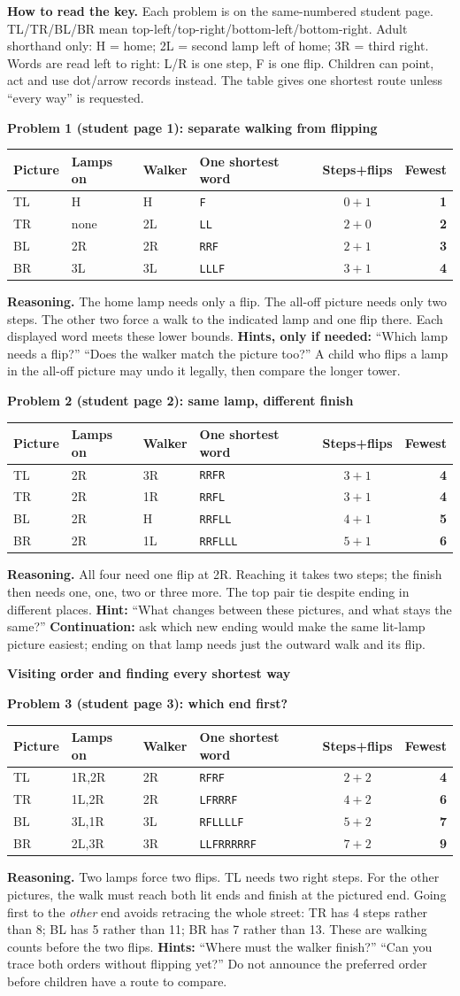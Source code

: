 \documentclass[11pt]{article}
\makeatletter
\newcommand{\head}[1]{\par\textbf{\large #1}\par}
\newcommand{\sub}[1]{\par\textbf{#1}\par}
\newcommand{\keyrow}[8]{#2 & #3 & #4 & \texttt{#5} & $#6+#7$ & \textbf{#8}\\}
\newenvironment{keytable}{\par\smallskip\begingroup\small\setlength{\tabcolsep}{7pt}\renewcommand{\arraystretch}{1.15}\begin{tabular}{@{}llllcr@{}}\textbf{Picture}&\textbf{Lamps on}&\textbf{Walker}&\textbf{One shortest word}&\textbf{Steps+flips}&\textbf{Fewest}\\\midrule}{\end{tabular}\endgroup\par\smallskip}
\makeatother
\begin{document}
\textbf{How to read the key.} Each problem is on the same-numbered student page. TL/TR/BL/BR mean top-left/top-right/bottom-left/bottom-right. Adult shorthand only: H = home; 2L = second lamp left of home; 3R = third right. Words are read left to right: L/R is one step, F is one flip. Children can point, act and use dot/arrow records instead. The table gives one shortest route unless ``every way'' is requested.

\sub{Problem 1 (student page 1): separate walking from flipping}
\begin{keytable}
\keyrow{1TL}{TL}{H}{H}{F}{0}{1}{1}
\keyrow{1TR}{TR}{none}{2L}{LL}{2}{0}{2}
\keyrow{1BL}{BL}{2R}{2R}{RRF}{2}{1}{3}
\keyrow{1BR}{BR}{3L}{3L}{LLLF}{3}{1}{4}
\end{keytable}
\textbf{Reasoning.} The home lamp needs only a flip. The all-off picture needs only two steps. The other two force a walk to the indicated lamp and one flip there. Each displayed word meets these lower bounds.
\textbf{Hints, only if needed:} ``Which lamp needs a flip?'' ``Does the walker match the picture too?'' A child who flips a lamp in the all-off picture may undo it legally, then compare the longer tower.

\sub{Problem 2 (student page 2): same lamp, different finish}
\begin{keytable}
\keyrow{2TL}{TL}{2R}{3R}{RRFR}{3}{1}{4}
\keyrow{2TR}{TR}{2R}{1R}{RRFL}{3}{1}{4}
\keyrow{2BL}{BL}{2R}{H}{RRFLL}{4}{1}{5}
\keyrow{2BR}{BR}{2R}{1L}{RRFLLL}{5}{1}{6}
\end{keytable}
\textbf{Reasoning.} All four need one flip at 2R. Reaching it takes two steps; the finish then needs one, one, two or three more. The top pair tie despite ending in different places.
\textbf{Hint:} ``What changes between these pictures, and what stays the same?'' \textbf{Continuation:} ask which new ending would make the same lit-lamp picture easiest; ending on that lamp needs just the outward walk and its flip.
\newpage
\head{Visiting order and finding every shortest way}
\sub{Problem 3 (student page 3): which end first?}
\begin{keytable}
\keyrow{3TL}{TL}{1R,2R}{2R}{RFRF}{2}{2}{4}
\keyrow{3TR}{TR}{1L,2R}{2R}{LFRRRF}{4}{2}{6}
\keyrow{3BL}{BL}{3L,1R}{3L}{RFLLLLF}{5}{2}{7}
\keyrow{3BR}{BR}{2L,3R}{3R}{LLFRRRRRF}{7}{2}{9}
\end{keytable}
\textbf{Reasoning.} Two lamps force two flips. TL needs two right steps. For the other pictures, the walk must reach both lit ends and finish at the pictured end. Going first to the \emph{other} end avoids retracing the whole street: TR has 4 steps rather than 8; BL has 5 rather than 11; BR has 7 rather than 13. These are walking counts before the two flips.
\textbf{Hints:} ``Where must the walker finish?'' ``Can you trace both orders without flipping yet?'' Do not announce the preferred order before children have a route to compare.
\end{document}
